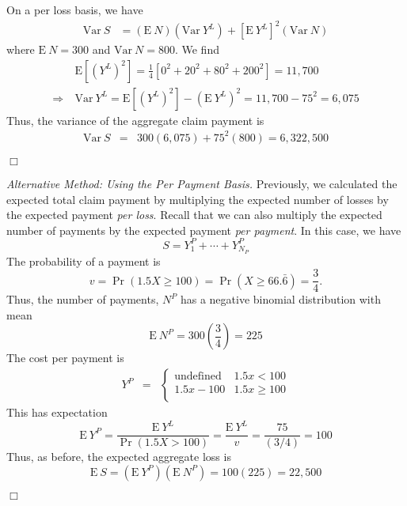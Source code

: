 \documentclass[12pt,letterpaper]{article}
\begin{document}
\noindent On a per loss basis, we have
\begin{align*}
\mathrm{Var~}S &= \left(\mathrm{E~}N \right) \left( \mathrm{Var~} Y^L \right) + \left[ \mathrm{E~} Y^L \right]^2 \left(\mathrm{Var~} N \right)
\end{align*}
where $\mathrm{E~}N = 300$ and $\mathrm{Var~} N = 800$. We find
\begin{align*}
&\mathrm{E} \left[ (Y^L)^2 \right] = \frac{1}{4} \left[ 0^2 + 20^2 + 80^2 + 200^2 \right] = 11,700 \\
\Rightarrow \ & \mathrm{Var~} Y^L = \mathrm{E} \left[ (Y^L)^2 \right] - \left( \mathrm{E~}Y^L \right)^2 = 11,700 - 75^2 = 6,075
\end{align*}
Thus, the variance of the aggregate claim payment is
\begin{eqnarray*}
\mathrm{Var~}S &=& 300(6,075) + 75^2 (800) = 6,322,500
\end{eqnarray*}
\begin{flushright}$\Box$\end{flushright}
\textit{Alternative Method: Using the Per Payment Basis.} Previously, we calculated the expected total claim payment by multiplying the expected number of losses by the expected payment \emph{per loss}. Recall that we can also multiply the expected number of payments by the expected payment \emph{per payment}. In this case, we have
\[S=Y_1^P + \cdots + Y_{N_P}^P \]
The probability of a payment is
\[v=\Pr(1.5X \ge 100)=\Pr(X \ge 66.\bar{6})=\frac{3}{4} .\]
Thus, the number of payments, $N^P$ has a negative binomial distribution
with mean
$$\mathrm{E~}N^P=300 \left(\frac{3}{4} \right)=225$$
The cost per payment is
\begin{eqnarray*}
Y^P &=&
\left\{
\begin{array}{cc}
\text{undefined} & 1.5x<100 \\
1.5x-100 & 1.5x\ge 100\\
\end{array}
\right.
\end{eqnarray*}
This has expectation
$$\mathrm{E~}Y^P=\frac{\mathrm{E~}Y^L}{\Pr(1.5X > 100)}=
\frac{\mathrm{E~}Y^L}{v}=\frac{75}{(3/4)}=100$$
Thus, as before, the expected aggregate loss is
$$\mathrm{E~}S=\left(\mathrm{E~}Y^P\right) \left(\mathrm{E~}N^P\right) =
100(225)=22,500$$
\begin{flushright}$\Box$\end{flushright}




\end{document}
